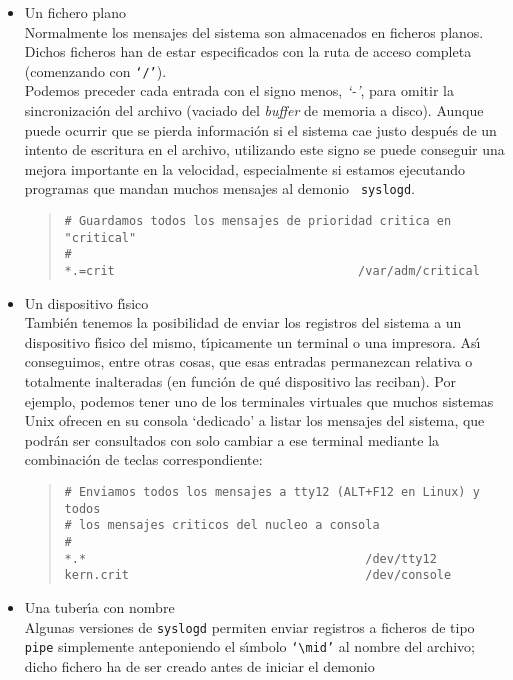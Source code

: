 \begin{itemize}
\item{}Un fichero plano\\
Normalmente los mensajes del sistema son almacenados en ficheros
planos. Dichos ficheros han de estar especificados con la ruta de acceso
completa (comenzando con {\tt `/'}).\\
Podemos preceder cada entrada con el signo menos, {\it `-'}, para omitir la
sincronizaci\'on del archivo (vaciado del {\it buffer} de memoria a disco).
Aunque puede ocurrir que se pierda informaci\'on si el sistema cae justo 
despu\'es de un intento de escritura en el archivo, utilizando este signo 
se puede conseguir una mejora importante en la velocidad, especialmente si 
estamos ejecutando programas que mandan muchos mensajes al demonio {\tt 
syslogd}.
\begin{quote}
\begin{verbatim}
# Guardamos todos los mensajes de prioridad critica en "critical"
#
*.=crit                                  /var/adm/critical
\end{verbatim}
\end{quote}
\item{}Un dispositivo f\'{\i}sico\\
Tambi\'en tenemos la posibilidad de enviar los registros del sistema a un 
dispositivo f\'{\i}sico del mismo, t\'{\i}picamente un terminal o una impresora.
As\'{\i} conseguimos, entre otras cosas, que esas entradas permanezcan relativa
o totalmente inalteradas (en funci\'on de qu\'e dispositivo las reciban). Por
ejemplo, podemos tener uno de los terminales virtuales que muchos sistemas Unix
ofrecen en su consola `dedicado' a listar los mensajes del sistema, que podr\'an
ser consultados con solo cambiar a ese terminal mediante la combinaci\'on de
teclas correspondiente:
\begin{quote}
\begin{verbatim}
# Enviamos todos los mensajes a tty12 (ALT+F12 en Linux) y todos
# los mensajes criticos del nucleo a consola
#
*.*                                       /dev/tty12
kern.crit                                 /dev/console
\end{verbatim}
\end{quote}
\item Una tuber\'{\i}a con nombre\\
Algunas versiones de {\tt syslogd} permiten enviar registros a ficheros de tipo
{\tt pipe} simplemente anteponiendo el s\'{\i}mbolo {\tt `$\mid$'} al nombre
del archivo; dicho fichero ha de ser creado antes de iniciar el demonio {\tt
}
\end{itemize}
